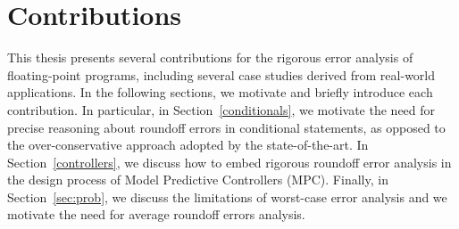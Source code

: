 \section{Contributions}
%
This thesis presents several contributions for the rigorous error analysis of floating-point programs, including several case studies derived from real-world applications.
%
%
%
In the following sections, we motivate and briefly introduce each contribution.
%
In particular, in Section~\ref{conditionals}, we motivate the need for precise reasoning about roundoff errors in conditional statements, as opposed to the over-conservative approach adopted by the state-of-the-art.
%
In Section~\ref{controllers}, we discuss how to embed rigorous roundoff error analysis in the design process of Model Predictive Controllers (MPC).
%
Finally, in Section~\ref{sec:prob}, we discuss the limitations of worst-case error analysis and we motivate the need for average roundoff errors analysis. 
%
%
%

%
%
%
%
%

